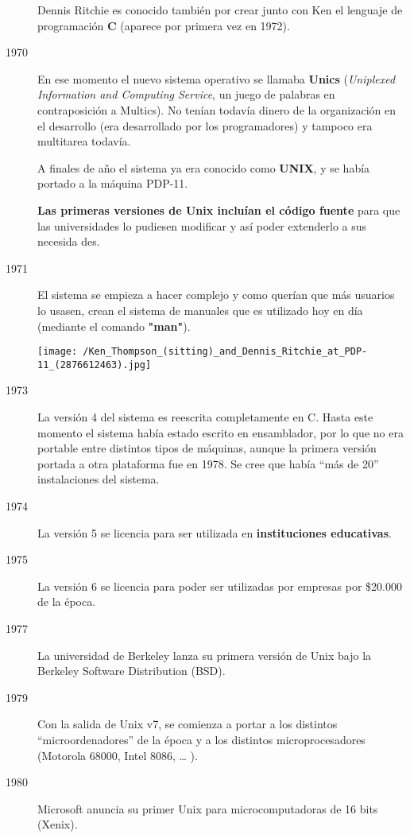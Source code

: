 \begin{description}
{Dennis Ritchie es conocido también por crear junto con Ken el lenguaje de programación \textbf{C} (aparece por primera vez en 1972).
}


\item[1970]En ese momento el nuevo sistema operativo se llamaba \textbf{Unics} (\textit{Uniplexed Information and Computing Service}, un juego de palabras en contraposición a  Multics). No tenían todavía dinero de la organización en el desarrollo (era desarrollado por los programadores) y tampoco era multitarea todavía.

A finales de año el sistema ya era conocido como \textbf{UNIX}, y se había portado a la máquina PDP-11.

\textbf{Las primeras versiones de Unix incluían el código fuente} para que las universidades lo pudiesen modificar y así poder extenderlo a sus necesida des.


\item[1971]El sistema se empieza a hacer complejo y como querían que más usuarios lo usasen, crean el sistema de manuales que es utilizado hoy en día (mediante el comando \textbf{"man"}).

\begin{center}
  \texttt{[image: /Ken\_Thompson\_(sitting)\_and\_Dennis\_Ritchie\_at\_PDP-11\_(2876612463).jpg]}
  \vspace{-10pt}\vspace{-13pt}
\end{center}


\item[1973]La versión 4 del sistema es reescrita completamente en C. Hasta este momento el sistema había estado escrito en ensamblador, por lo que no era portable entre distintos tipos de máquinas, aunque la primera versión portada a otra plataforma fue en 1978. Se cree que había “más de 20” instalaciones del sistema.

\item[1974]La versión 5 se licencia para ser utilizada en \textbf{instituciones educativas}.

\item[1975]La versión 6 se licencia para poder ser utilizadas por empresas por \$20.000 de la época.

\item[1977]La universidad de Berkeley lanza su primera versión de Unix bajo la Berkeley Software Distribution (BSD).

\item[1979]Con la salida de Unix v7, se comienza a portar a los distintos ``microordenadores'' de la época y a los distintos microprocesadores (Motorola 68000, Intel 8086, … ).

\item[1980]Microsoft anuncia su primer Unix para microcomputadoras de 16 bits (Xenix).
\end{description}

